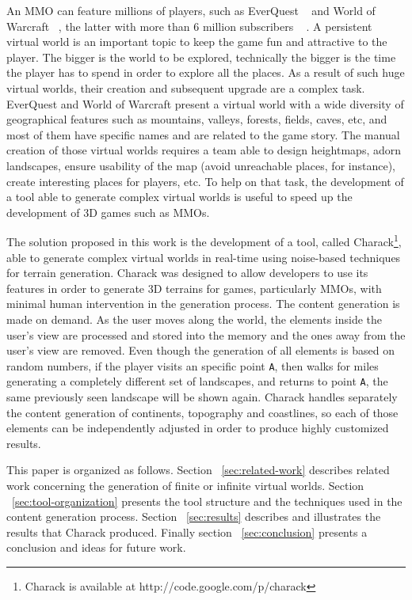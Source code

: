 \documentclass[10pt, conference, compsocconf]{IEEEtran}
\begin{document}
An MMO can feature millions of players, such as EverQuest ~\cite{EverQuest} and World of Warcraft ~\cite{Blizzard}, the latter with more than 6 million subscribers ~ \cite{vicioEstrutura}. A persistent virtual world is an important topic to keep the game fun and attractive to the player. The bigger is the world to be explored, technically the bigger is the time the player has to spend in order to explore all the places. As a result of such huge virtual worlds, their creation and subsequent upgrade are a complex task. EverQuest and World of Warcraft present a virtual world with a wide diversity of geographical features such as mountains, valleys, forests, fields, caves, etc, and most of them have specific names  and are related to the game story. The manual creation of those virtual worlds requires a team able to design heightmaps, adorn landscapes, ensure usability of the map (avoid unreachable places, for instance), create interesting places for players, etc. To help on that task, the development of a tool able to generate complex virtual worlds is useful to speed up the development of 3D games such as MMOs.

The solution proposed in this work is the development of a tool, called Charack\footnote{Charack is available at http://code.google.com/p/charack}, able to generate complex virtual worlds in real-time using noise-based techniques for terrain generation. Charack was designed to allow developers to use its features in order to generate 3D terrains for games, particularly MMOs, with minimal human intervention in the generation process. The content generation is made on demand. As the user moves along the world, the elements inside the user's view are processed and stored into the memory and the ones away from the user's view are removed. Even though the generation of all elements is based on random numbers, if the player visits an specific point {\tt A}, then walks for miles generating a completely different set of landscapes, and returns to point {\tt A}, the same previously seen landscape will be shown again. Charack handles separately the content generation of continents, topography and coastlines, so each of those elements can be independently adjusted in order to produce highly customized results.

This paper is organized as follows. Section ~\ref{sec:related-work} describes related work concerning the generation of finite or infinite virtual worlds. Section ~\ref{sec:tool-organization} presents the tool structure and the techniques used in the content generation process. Section ~\ref{sec:results} describes and illustrates the results that Charack produced. Finally section ~\ref{sec:conclusion} presents a conclusion and ideas for future work.
\end{document}
